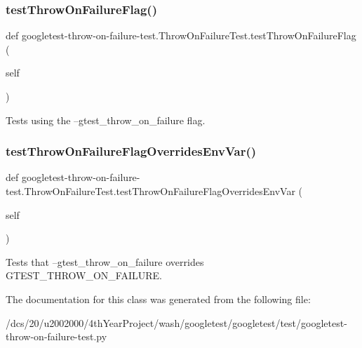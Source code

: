 \subsubsection{\texorpdfstring{test\+Throw\+On\+Failure\+Flag()}{testThrowOnFailureFlag()}}
{\footnotesize\ttfamily def googletest-\/throw-\/on-\/failure-\/test.\+Throw\+On\+Failure\+Test.\+test\+Throw\+On\+Failure\+Flag (\begin{DoxyParamCaption}\item[{}]{self }\end{DoxyParamCaption})}

\begin{DoxyVerb}Tests using the --gtest_throw_on_failure flag.\end{DoxyVerb}
 \mbox{\label{classgoogletest-throw-on-failure-test_1_1ThrowOnFailureTest_a18515553dbfe7b3e6ed6449fa81893c1}} 
\subsubsection{\texorpdfstring{test\+Throw\+On\+Failure\+Flag\+Overrides\+Env\+Var()}{testThrowOnFailureFlagOverridesEnvVar()}}
{\footnotesize\ttfamily def googletest-\/throw-\/on-\/failure-\/test.\+Throw\+On\+Failure\+Test.\+test\+Throw\+On\+Failure\+Flag\+Overrides\+Env\+Var (\begin{DoxyParamCaption}\item[{}]{self }\end{DoxyParamCaption})}

\begin{DoxyVerb}Tests that --gtest_throw_on_failure overrides GTEST_THROW_ON_FAILURE.\end{DoxyVerb}
 

The documentation for this class was generated from the following file\+:\begin{DoxyCompactItemize}
\item 
/dcs/20/u2002000/4th\+Year\+Project/wash/googletest/googletest/test/googletest-\/throw-\/on-\/failure-\/test.\+py\end{DoxyCompactItemize}
